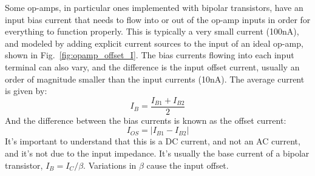 Some op-amps, in particular ones implemented with bipolar transistors, have an input bias current that needs to flow into or out of the op-amp inputs in order for everything to function properly. This is typically a very small current (100nA), and modeled by adding explicit current sources to the input of an ideal op-amp, shown in Fig.~\ref{fig:opamp_offset_I}.  The bias currents flowing into each input terminal can also vary, and the difference is the input offset current, usually an order of magnitude smaller than the input currents (10nA).  The average current is given by:
\begin{equation}
       I_B = \frac{I_{B1}+I_{B2}}{2}
\end{equation}
And the difference between the bias currents is known as the offset current:
\begin{equation}
        I_{OS} = |I_{B1} - I_{B2} |
\end{equation}
It's important to understand that this is a DC current, and not an AC current, and it's not due to the input impedance.  It's usually the base current of a bipolar transistor, $I_B = I_C/\beta$.  Variations in $\beta$ cause the input offset.
